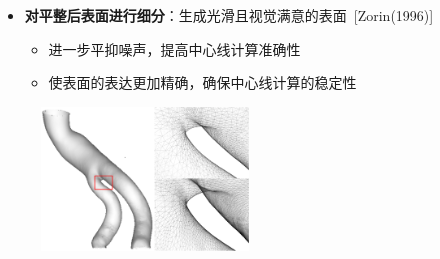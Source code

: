 \begin{frame}
\begin{itemize}
  \item \textbf{对平整后表面进行细分}：生成光滑且视觉满意的表面~[Zorin(1996)]
  \begin{itemize}
    \item 进一步平抑噪声，提高中心线计算准确性
    \item 使表面的表达更加精确，确保中心线计算的稳定性
  \end{itemize}
\end{itemize}
\begin{figure}[t]
\centering
\includegraphics[height=1.5in]{../../Figures/postprocessing/centerlines/subdivision.eps}
\end{figure}
\end{frame} 

